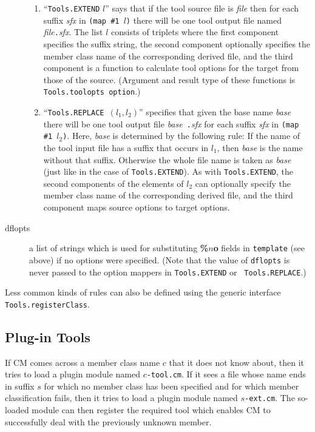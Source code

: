 \documentclass{article}
\begin{document}
\begin{description}
\begin{enumerate}
\item ``{\tt Tools.EXTEND} $l$'' says that if the tool source file is
{\it file} then for each suffix {\it sfx} in {\tt (map \#1 $l$)} there
will be one tool output file named {\it file}{\tt .}{\it sfx}.  The
list $l$ consists of triplets where the first component specifies the
suffix string, the second component optionally specifies the
member class name of the corresponding derived file, and the
third component is a function to calculate tool options for the 
target from those of the source. (Argument and result type of these
functions is {\tt Tools.toolopts option}.)
\item ``{\tt Tools.REPLACE }$(l_1, l_2)$'' specifies that given the
base name {\it base} there will be one tool output file {\it base}{\tt
.}{\it sfx} for each suffix {\it sfx} in {\tt (map \#1 $l_2$)}.  Here,
{\it base} is determined by the following rule: If the name of the
tool input file has a suffix that occurs in $l_1$, then {\it base} is
the name without that suffix.  Otherwise the whole file name is taken
as {\it base} (just like in the case of {\tt Tools.EXTEND}).  As with
{\tt Tools.EXTEND}, the second components of the elements of $l_2$ can
optionally specify the member class name of the corresponding derived
file, and the third component maps source options to target options.
\end{enumerate}
\item[dflopts] a list of strings which is used for
substituting {\bf \%$n$o} fields in {\tt template} (see above) if no
options were specified.  (Note that the value of {\tt dflopts} is never
passed to the option mappers in {\tt Tools.EXTEND} or {\tt
Tools.REPLACE}.)
\end{description}

Less common kinds of rules can also be defined using the generic
interface {\tt Tools.registerClass}.

\subsection{Plug-in Tools}

If CM comes across a member class name $c$ that it does not know
about, then it tries to load a plugin module named $c${\tt -tool.cm}.
If it sees a file whose name ends in suffix $s$ for which no member
class has been specified and for which member classification fails,
then it tries to load a plugin module named $s${\tt -ext.cm}.  The
so-loaded module can then register the required tool which enables CM
to successfully deal with the previously unknown member.
\end{document}
